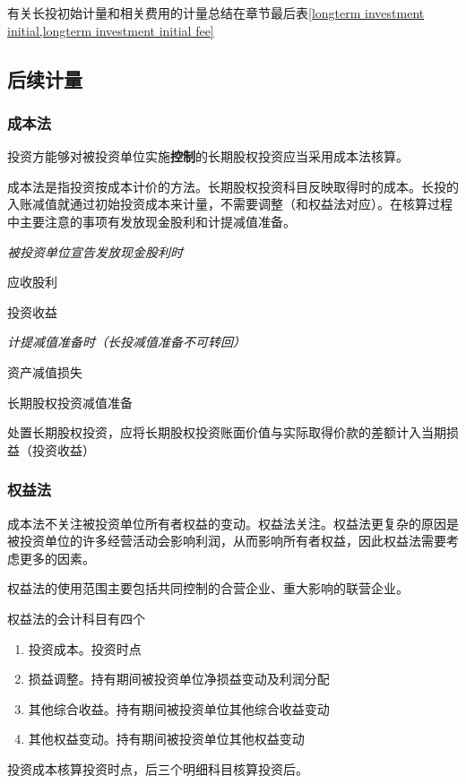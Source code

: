 \documentclass[UTF8,12pt]{ctexart}
\newenvironment{Dr}{%
	\begin{list}{}%
		{
			\setlength{\leftmargin}{2em}
			\setlength{\labelwidth}{2em}
			\setlength{\labelsep}{0pt}
			\setlength{\itemindent}{0pt}
			\setlength{\listparindent}{0pt}
			\setlength{\parsep}{0pt}
			\setlength{\topsep}{0pt}
		}
		\item[\textbf{借：}]
	}{%
	\end{list}
}
\newenvironment{Cr}{%
	\begin{list}{}%
		{
			\setlength{\leftmargin}{2em}
			\setlength{\labelwidth}{2em}
			\setlength{\labelsep}{0pt}
			\setlength{\itemindent}{0pt}
			\setlength{\listparindent}{0pt}
			\setlength{\parsep}{0pt}
			\setlength{\topsep}{0pt}
		}
		\item[\textbf{贷：}]
	}{%
	\end{list}
}
\numberwithin{equation}{section} %
\numberwithin{figure}{section}
\numberwithin{table}{section}
\begin{document}
	有关长投初始计量和相关费用的计量总结在章节最后表\ref{longterm investment initial,longterm investment initial fee}
	
	
	\subsection{后续计量}
	
	\subsubsection{成本法}
	投资方能够对被投资单位实施\textbf{控制}的长期股权投资应当采用成本法核算。
	
	成本法是指投资按成本计价的方法。长期股权投资科目反映取得时的成本。长投的入账减值就通过初始投资成本来计量，不需要调整（和权益法对应）。在核算过程中主要注意的事项有发放现金股利和计提减值准备。
	
	\textit{被投资单位宣告发放现金股利时}
	
	\begin{Dr}
		应收股利
	\end{Dr}
	\begin{Cr}
		投资收益
	\end{Cr}
	
	\textit{计提减值准备时（长投减值准备不可转回）}
	
	\begin{Dr}
		资产减值损失
	\end{Dr}
	\begin{Cr}
		长期股权投资减值准备
	\end{Cr}
	
	处置长期股权投资，应将长期股权投资账面价值与实际取得价款的差额计入当期损益（投资收益）
	
	\subsubsection{权益法}
	成本法不关注被投资单位所有者权益的变动。权益法关注。权益法更复杂的原因是被投资单位的许多经营活动会影响利润，从而影响所有者权益，因此权益法需要考虑更多的因素。
	
	
	权益法的使用范围主要包括共同控制的合营企业、重大影响的联营企业。
	
	权益法的会计科目有四个
	\begin{enumerate}
		\item 投资成本。投资时点
		
		\item 损益调整。持有期间被投资单位净损益变动及利润分配
		
		\item 其他综合收益。持有期间被投资单位其他综合收益变动
		
		\item 其他权益变动。持有期间被投资单位其他权益变动
	\end{enumerate}
	投资成本核算投资时点，后三个明细科目核算投资后。
	
\end{document}

